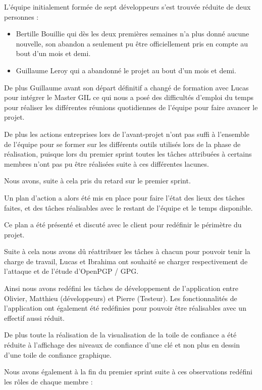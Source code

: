\documentclass{../res/univ-projet}
\begin{document}
    L'équipe initialement formée de sept développeurs
    s'est trouvée réduite de deux personnes :
    \begin{itemize}
      \item Bertille Bouillie qui dès les deux premières semaines n'a plus donné
      aucune nouvelle, son abandon a seulement pu être officiellement pris en compte au bout d'un mois et demi.
      \item Guillaume Leroy qui a abandonné le projet au bout d'un mois et demi.
    \end{itemize}

    De plus Guillaume avant son départ définitif a changé de formation avec Lucas pour intégrer le Master GIL
    ce qui nous a posé des difficultés d'emploi du temps pour réaliser les différentes réunions quotidiennes
    de l'équipe pour faire avancer le projet.

    De plus les actions entreprises lors de l'avant-projet n'ont pas suffi à l'ensemble de l'équipe 
    pour se former sur les différents outils utilisés lors de la phase de réalisation,
    puisque lors du premier sprint toutes les tâches attribuées à certains membres n'ont pas pu être
    réalisées suite à ces différentes lacunes.

    Nous avons, suite à cela pris du retard sur le premier sprint.

    Un plan d'action a alors été mis en place pour faire l'état des lieux des tâches
    faites, et des tâches réalisables avec le restant de l'équipe et le temps disponible.

    Ce plan a été présenté et discuté avec le client pour redéfinir le périmètre du projet.

    Suite à cela nous avons dû réattribuer les tâches à chacun pour pouvoir tenir la charge de travail,
    Lucas et Ibrahima ont souhaité se charger respectivement de l'attaque et de l'étude d'OpenPGP / GPG.

    Ainsi nous avons redéfini les tâches de développement de l'application
    entre Olivier, Matthieu (développeurs) et Pierre (Testeur).
    Les fonctionnalités de l'application ont également été redéfinies pour pouvoir être réalisables avec un effectif
    aussi réduit.

    De plus toute la réalisation de la visualisation de la toile de confiance a été réduite
    à l'affichage des niveaux de confiance d'une clé et non plus en dessin d'une toile de confiance graphique.

    Nous avons également à la fin du premier sprint suite à ces observations redéfini les rôles de chaque membre : 
\end{document}
